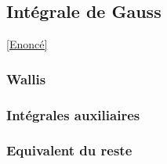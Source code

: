 \documentclass{book}
\begin{document}
	\subsection{Intégrale de Gauss}
	\label{Intégrale de Gauss corrigé}
	\textcolor{blue}{\hyperref[gauss]{[Enoncé]}}
	\subsubsection{Wallis}
	
	\subsubsection{Intégrales auxiliaires}
	
	\subsubsection{Equivalent du reste}
	
\end{document}
